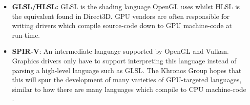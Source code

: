 \documentclass[a4paper,12pt,twoside,openright]{report}
\begin{document}
\begin{itemize}
    \item \textbf{GLSL/HLSL:} GLSL is the shading language OpenGL uses whilst
    HLSL is the equivalent found in Direct3D. GPU vendors are often responsible
    for writing drivers which compile source-code down to GPU machine-code at
    run-time. %


    \item \textbf{SPIR-V}: An intermediate language supported by OpenGL and
    Vulkan. Graphics drivers only have to support interpreting this language
    instead of parsing a high-level language such as GLSL. The Khronos Group
    hopes that this will spur the development of many varieties of GPU-targeted
    languages, similar to how there are many languages which compile to CPU
    machine-code \cite{SPIRV}. %



\end{itemize}


\end{document}
